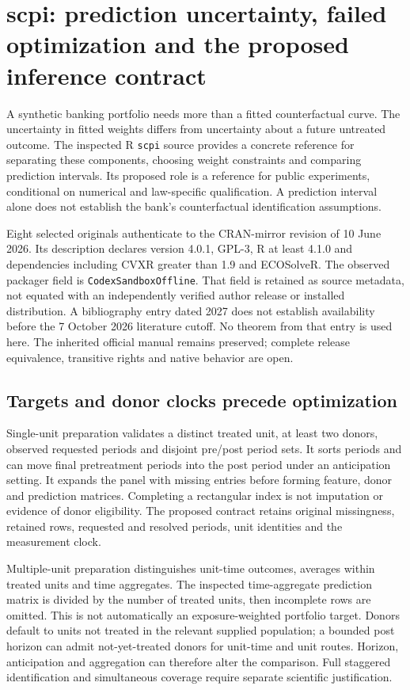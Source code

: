 \section{scpi: prediction uncertainty, failed optimization and the proposed inference contract}
\label{sec:exec24-scpi-reuse}

A synthetic banking portfolio needs more than a fitted counterfactual curve.
The uncertainty in fitted weights differs from uncertainty about a future
untreated outcome. The inspected R \texttt{scpi} source provides a concrete
reference for separating these components, choosing weight constraints and
comparing prediction intervals. Its proposed role is a reference for public
experiments, conditional on numerical and law-specific qualification. A
prediction interval alone does not establish the bank's counterfactual
identification assumptions.\citep{exec24_scpi_choice}

Eight selected originals authenticate to the CRAN-mirror revision of 10 June
2026. Its description declares version 4.0.1, GPL-3, R at least 4.1.0 and
dependencies including CVXR greater than 1.9 and ECOSolveR. The observed
packager field is \texttt{CodexSandboxOffline}. That field is retained as
source metadata, not equated with an independently verified author release
or installed distribution. A bibliography entry dated 2027 does not establish
availability before the 7 October 2026 literature cutoff. No theorem from
that entry is used here. The inherited official manual remains preserved;
complete release equivalence, transitive rights and native behavior are open.
\citep{exec24_scpi_source,v12_sw_scpi}

\subsection{Targets and donor clocks precede optimization}
Single-unit preparation validates a distinct treated unit, at least two
donors, observed requested periods and disjoint pre/post period sets. It sorts
periods and can move final pretreatment periods into the post period under
an anticipation setting. It expands the panel with missing entries before
forming feature, donor and prediction matrices. Completing a rectangular
index is not imputation or evidence of donor eligibility. The proposed
contract retains original missingness, retained rows, requested and resolved
periods, unit identities and the measurement clock.
\citep{exec24_scpi_source}

Multiple-unit preparation distinguishes unit-time outcomes, averages within
treated units and time aggregates. The inspected time-aggregate prediction
matrix is divided by the number of treated units, then incomplete rows are
omitted. This is not automatically an exposure-weighted portfolio target.
Donors default to units not treated in the relevant supplied population;
a bounded post horizon can admit not-yet-treated donors for unit-time and
unit routes. Horizon, anticipation and aggregation can therefore alter the
comparison. Full staggered identification and simultaneous coverage require
separate scientific justification.\citep{exec24_scpi_source,exec24_scpi_choice}

